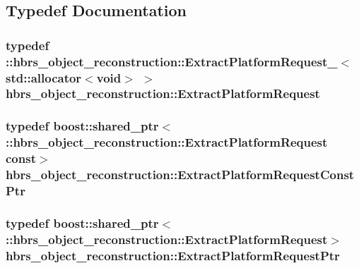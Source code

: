 \subsection{\-Typedef \-Documentation}
\hypertarget{namespacehbrs__object__reconstruction_a41ceceb45876d46f34df4d565d3b4e66}{
\subsubsection[{\-Extract\-Platform\-Request}]{\setlength{\rightskip}{0pt plus 5cm}typedef \-::{\bf hbrs\-\_\-object\-\_\-reconstruction\-::\-Extract\-Platform\-Request\-\_\-}$<$std\-::allocator$<$void$>$ $>$ {\bf hbrs\-\_\-object\-\_\-reconstruction\-::\-Extract\-Platform\-Request}}}\label{namespacehbrs__object__reconstruction_a41ceceb45876d46f34df4d565d3b4e66}
\hypertarget{namespacehbrs__object__reconstruction_a5acafbaed77308b73b7cce500804d356}{
\subsubsection[{\-Extract\-Platform\-Request\-Const\-Ptr}]{\setlength{\rightskip}{0pt plus 5cm}typedef boost\-::shared\-\_\-ptr$<$ \-::{\bf hbrs\-\_\-object\-\_\-reconstruction\-::\-Extract\-Platform\-Request} const$>$ {\bf hbrs\-\_\-object\-\_\-reconstruction\-::\-Extract\-Platform\-Request\-Const\-Ptr}}}\label{namespacehbrs__object__reconstruction_a5acafbaed77308b73b7cce500804d356}
\hypertarget{namespacehbrs__object__reconstruction_afc16273e7559a8602e4fc645c734dd9b}{
\subsubsection[{\-Extract\-Platform\-Request\-Ptr}]{\setlength{\rightskip}{0pt plus 5cm}typedef boost\-::shared\-\_\-ptr$<$ \-::{\bf hbrs\-\_\-object\-\_\-reconstruction\-::\-Extract\-Platform\-Request}$>$ {\bf hbrs\-\_\-object\-\_\-reconstruction\-::\-Extract\-Platform\-Request\-Ptr}}}\label{namespacehbrs__object__reconstruction_afc16273e7559a8602e4fc645c734dd9b}

